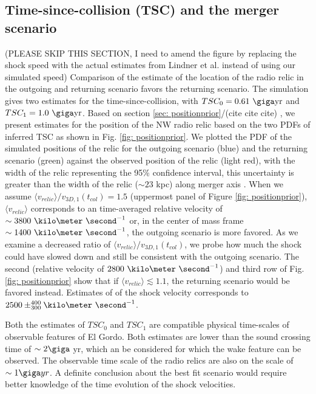 \subsection{Time-since-collision (TSC) and the merger scenario}
(PLEASE SKIP THIS SECTION, I need to amend the figure by replacing the
shock speed with the actual estimates from Lindner et al. instead of using
our simulated speed)
Comparison of the estimate of the location of the radio relic in the
outgoing and returning scenario favors the returning scenario.
The simulation gives two estimates for
the time-since-collision, with $TSC_0 = 0.61~\giga \text{yr}$ and $TSC_1 =
1.0~\giga \text{yr}$. Based on section \ref{sec: positionprior}/(cite cite cite) , we
present estimates for the position of the NW radio relic based on the two PDFs
of inferred TSC as shown in Fig. \ref{fig: positionprior}. We plotted
the PDF of the simulated positions of the relic for the outgoing scenario
(blue) and the returning scenario (green) against
the observed position of the relic (light red), with the width of the
relic representing the 95\% confidence interval, this uncertainty is greater than the width of the relic ($\sim$$23$
kpc) along merger axis \citep{L13}. When we
assume $\langle v_{relic} \rangle / v_{3D,1}(t_{col}) = 1.5$ (uppermost
panel of Figure \ref{fig: positionprior}), $\langle v_{relic} \rangle$
corresponds to an time-averaged relative velocity of $\sim 3800~\kilo
\meter~\second^{-1}$ or, in the center of
mass frame $\sim 1400~\kilo\meter~\second^{-1}$, the outgoing scenario 
is more favored. As we examine a decreased ratio of  $\langle v_{relic} \rangle /
v_{3D,1}(t_{col})$, we probe how much the shock could have slowed down
and still be consistent with the outgoing scenario. The second (relative
velocity of $2800~\kilo\meter~\second^{-1}$) and third row of
Fig. \ref{fig: positionprior} show that if $\langle v_{relic} \rangle
\lesssim 1.1 $, the returning scenario would be favored instead.
Estimates of \citet{L13} of the shock velocity corresponds to $2500 \pm
^{400}_{300} \kilo \meter~\second^{-1}$.

Both the estimates of $TSC_0$ and $TSC_1$ are
compatible physical time-scales of observable features of El Gordo.  
Both estimates are lower than the sound crossing time of $\sim 2 \giga$ yr,
which an be considered for which the wake feature can be observed. 
The observable time scale of the radio relics are also on the scale of $\sim 1 \giga yr$. 
A definite conclusion about the best fit scenario would require better
knowledge of the time evolution of the shock velocities. 

